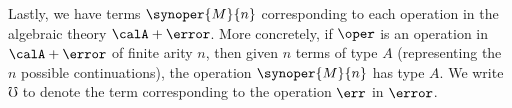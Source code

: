 \documentclass[acmsmall,screen,review,anonymous]{acmart}
\theoremstyle{remark}
\begin{document}

Lastly, we have terms $\synoper{M}{n}$ corresponding to each operation in the
algebraic theory $\calA + \error$. More concretely, if $\oper$ is an operation
in $\calA + \error$ of finite arity $n$, then given $n$ terms of type $A$
(representing the $n$ possible continuations), the operation $\synoper{M}{n}$
has type $A$. We write $\mho$ to denote the term corresponding to the operation
$\err$ in $\error$.


\end{document}
